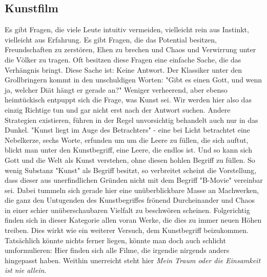 \subsection{Kunstfilm}

Es gibt Fragen, die viele Leute intuitiv vermeiden, vielleicht rein aus
Instinkt, vielleicht aus Erfahrung. 
Es gibt Fragen, die das Potential besitzen, Freundschaften zu zerstören, Ehen zu
brechen und Chaos und Verwirrung unter die Völker zu tragen. 
Oft besitzen diese Fragen eine einfache Sache, die das Verhängnis bringt. Diese
Sache ist: Keine Antwort. 
Der Klassiker unter den Grollbringern kommt in den unschuldigen Worten: 
"Gibt es einen Gott, und wenn ja, welcher Diät hängt er gerade an?"
Weniger verheerend, aber ebenso heimtückisch entpuppt sich die Frage, was Kunst
sei. 
Wir werden hier also das einzig Richtige tun und gar nicht erst nach der Antwort
suchen. 
Andere Strategien existieren, führen in der Regel unvorsichtig behandelt auch
nur in das Dunkel. 
"Kunst liegt im Auge des Betrachters" - eine bei Licht betrachtet eine
Nebelkerze, sechs Worte, erfunden um um die Leere zu füllen, die sich auftut,
blickt man unter den Kunstbegriff, eine Leere, die endlos ist. 
Und so kann sich Gott und die Welt als Kunst verstehen, ohne diesen hohlen
Begriff zu füllen.
So wenig Substanz "Kunst" als Begriff besitzt, so verbreitet scheint die
Vorstellung, dass dieser aus unerfindlichen Gründen nicht mit dem Begriff
"B-Movie" vereinbar sei. 
Dabei tummeln sich gerade hier eine unüberblickbare Masse an Machwerken, die
ganz den Untugenden des Kunstbegriffes frönend Durcheinander und Chaos in einer schier
unüberschaubaren Vielfalt zu beschwören scheinen.
Folgerichtig finden sich in dieser Kategorie allen voran Werke, die dies zu
immer neuen Höhen treiben.
Dies wirkt wie ein weiterer Versuch, dem Kunstbegriff beizukommen. 
Tatsächlich könnte nichts ferner liegen, könnte man doch auch schlicht
umformulieren: 
Hier finden sich alle Filme, die irgendie nirgends anders
hingepasst haben.
Weithin unerreicht steht hier \emph{Mein Traum oder die Einsamkeit ist nie
allein}.


